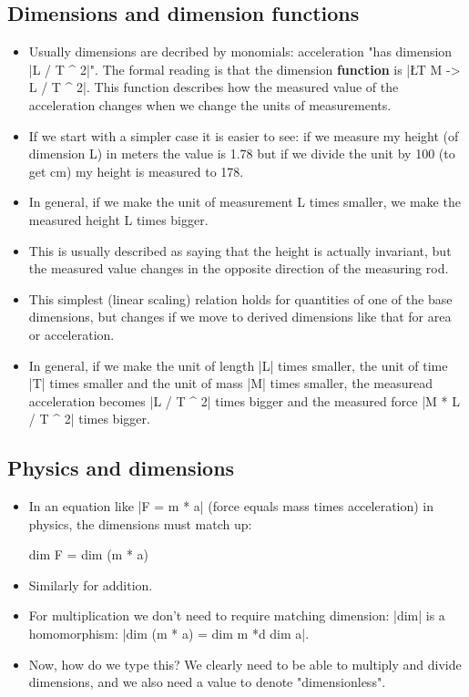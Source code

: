 \documentclass{article}
\begin{document}
\subsection{Dimensions and dimension functions}
\label{sec:org5f28f0f}
\begin{itemize}
\item Usually dimensions are decribed by monomials: acceleration "has
dimension |L / T ^ 2|". The formal reading is that the dimension
\textbf{function} is |\L T M -> L / T ^ 2|. This function describes how the
measured value of the acceleration changes when we change the units
of measurements.
\item If we start with a simpler case it is easier to see: if we measure
my height (of dimension L) in meters the value is 1.78 but if we
divide the unit by 100 (to get cm) my height is measured to 178.
\item In general, if we make the unit of measurement L times smaller, we
make the measured height L times bigger.
\item This is usually described as saying that the height is actually
invariant, but the measured value changes in the opposite direction
of the measuring rod.
\item This simplest (linear scaling) relation holds for quantities of one
of the base dimensions, but changes if we move to derived dimensions
like that for area or acceleration.
\item In general, if we make the unit of length |L| times smaller, the
unit of time |T| times smaller and the unit of mass |M| times
smaller, the measuread acceleration becomes |L / T ^ 2| times bigger and
the measured force |M * L / T ^ 2| times bigger.
\end{itemize}
\subsection{Physics and dimensions}
\label{sec:orgfce6857}
\begin{itemize}
\item In an equation like |F = m * a| (force equals mass times
acceleration) in physics, the dimensions must match up:
\begin{spec}
dim F = dim (m * a)
\end{spec}
\item Similarly for addition.
\item For multiplication we don't need to require matching
dimension: |dim| is a homomorphism: |dim (m * a) = dim m *d dim a|.
\item Now, how do we type this? We clearly need to be able to multiply and
divide dimensions, and we also need a value to denote
"dimensionless".
\end{itemize}
\end{document}
